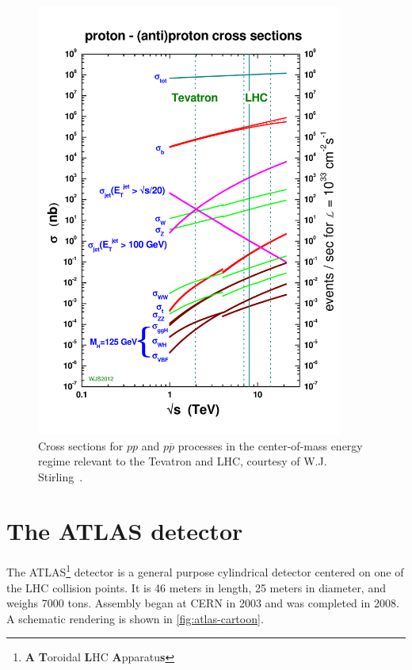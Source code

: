 \begin{figure}[tp]
  \centering
  \includegraphics[width=0.90\textwidth]{figures/lhc-atlas/crosssections2012_v5}
  \caption{Cross sections for $pp$ and $p\overline{p}$ processes in the center-of-mass energy regime relevant to the Tevatron and LHC, courtesy of W.J. Stirling~\cite{2013.stirling.cross-sections}.}
  \label{fig:lhc-stirling}
\end{figure}

\section{The ATLAS detector}
\label{sec:atlas}

The ATLAS\footnote{\textbf{A} \textbf{T}oroidal \textbf{L}HC \textbf{A}pparatu\textbf{s}} detector is a general purpose cylindrical detector centered on one of the LHC collision points. It is 46 meters in length, 25 meters in diameter, and weighs 7000 tons. Assembly began at CERN in 2003 and was completed in 2008. A schematic rendering is shown in \cref{fig:atlas-cartoon}.

